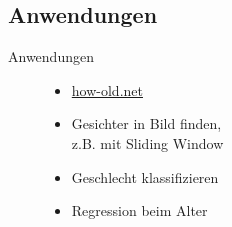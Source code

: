 \subsection{Anwendungen}
\begin{frame}{Anwendungen}
    \begin{figure}[ht]
        \begin{minipage}[b]{0.45\linewidth}
            \begin{itemize}
                \item \href{https://how-old.net}{how-old.net}
                \item Gesichter in Bild finden,\\
                      z.B. mit Sliding Window
                \item Geschlecht klassifizieren
                \item Regression beim Alter
            \end{itemize}
            \vspace{2cm}
        \end{minipage}
        \hspace{0.5cm}
        \begin{minipage}[b]{0.45\linewidth}
            \centering
        \end{minipage}
    \end{figure}
\end{frame}
